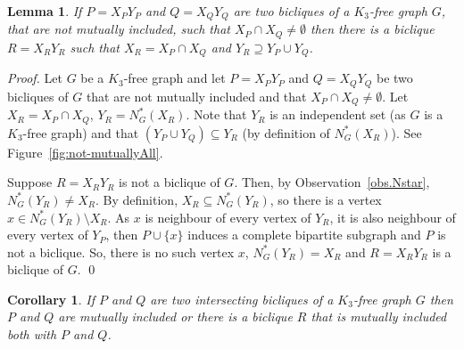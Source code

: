 \documentclass{article}
\newcommand{\margem}[2]
        {\mbox{}\marginpar{%
        \raggedright\textcolor{#2}{%
        \hspace{0pt}\bfseries\ssmall #1\\}}}
\newcommand{\comment}[3]{\margem{\textit{(#1)}\\ #3}{#2}}
\newtheorem{lemma}{Lemma}
\newtheorem{corollary}{Corollary}
\begin{document}
\begin{lemma}\label{lem.bicliqueintersecting}
  If $P  = X_PY_P$ and  $Q = X_QY_Q$ are  two bicliques of  a $K_3$-free
  graph   $G$,    that   are   not   mutually    included,   such   that
  $X_P \cap  X_Q \neq \emptyset$ then  there is a biclique  $R = X_RY_R$
  such that $X_R = X_P \cap X_Q$ and $Y_R \supseteq Y_P \cup Y_Q$.
\end{lemma}
\begin{proof}
  Let $G$ be a $K_3$-free graph and let $P = X_PY_P$ and $Q = X_QY_Q$ be
  two  bicliques  of  $G$  that  are  not  mutually  included  and  that
  $X_P  \cap   X_Q  \neq  \emptyset$.    Let  $X_R  =  X_P   \cap  X_Q$,
  $Y_R = N_G^*(X_R)$.  Note that $Y_R$  is an independent set (as $G$ is
  a  $K_3$-free graph)  and  that  $(Y_P \cup  Y_Q)  \subseteq Y_R$  (by
  definition of $N_G^*(X_R)$). See Figure~\ref{fig:not-mutuallyAll}.

  Suppose  $R   =  X_RY_R$  is  not   a  biclique  of  $G$.    Then,  by
  Observation~\ref{obs.Nstar},   $N_G^*(Y_R)   \neq  X_R$.    By   definition,
  $X_R    \subseteq    N_G^*(Y_R)$,    so     there    is    a    vertex
  $x \in N_G^*(Y_R) \setminus X_R$.  As $x$ is neighbour of every vertex
  of  $Y_R$,  it is  also  neighbour  of  every  vertex of  $Y_P$,  then
  $P \cup \{x\}$ induces a complete  bipartite subgraph and $P$ is not a
  biclique. So,  there is  no such  vertex $x$,  $N_G^*(Y_R) =  X_R$ and
  $R = X_RY_R$ is a biclique of $G$. \qed
\end{proof}

\begin{corollary}\label{cor.inter.mutuallyorR}
  If $P$  and $Q$ are two  intersecting bicliques of a  $K_3$-free graph
  $G$ then $P$ and $Q$ are mutually  included or there is a biclique $R$
  that is mutually included both with $P$ and $Q$.
\end{corollary}
\end{document}
